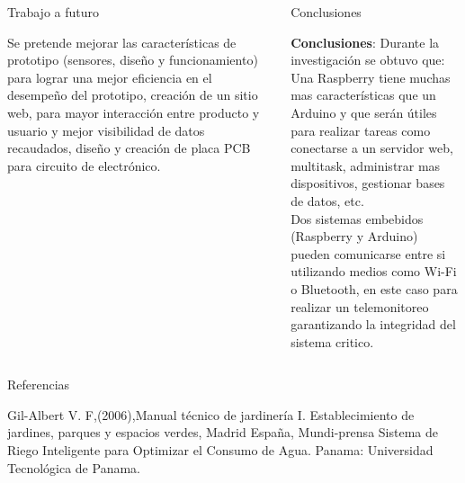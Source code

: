 \documentclass{beamer}
\begin{document}
\begin{frame}[fragile]{}
\begin{columns}[t]
  
  \begin{column}{0.46\linewidth}
  	\begin{block}{Trabajo a futuro}
  		\begin{minipage}[t]{1\textwidth}
  			\vspace{0pt}
 Se pretende mejorar las características de prototipo (sensores, diseño y funcionamiento) para lograr una mejor eficiencia en el desempeño del prototipo, creación de un sitio web, para mayor interacción entre producto y usuario y mejor visibilidad de datos recaudados, diseño y creación de placa PCB para circuito de electrónico.
  		\end{minipage} 
  	\end{block}
  \end{column}

	     \begin{column}{0.46\linewidth}
	     	\begin{block}{Conclusiones}\justifying
	     		\begin{minipage}[t]{0.96\textwidth}
	     			\textbf{Conclusiones}: 
	     			Durante la investigación se obtuvo que:\\
	     			Una Raspberry tiene muchas mas características que un Arduino y que serán útiles para realizar tareas como conectarse a un servidor web, multitask, administrar mas dispositivos, gestionar bases de datos, etc.
	     			\\
	     			Dos sistemas embebidos (Raspberry y Arduino) pueden comunicarse entre si utilizando medios como Wi-Fi o Bluetooth, en este caso para realizar un telemonitoreo garantizando la integridad del sistema critico.
	     			\\
	     			
	     		\end{minipage}
	     		
	     	\end{block}   
	     \end{column}
\end{columns}

\justifying
\begin{columns}[t]
 \begin{column}{0.90\linewidth}
      \begin{block}{Referencias}
	\begin{minipage}[t]{0.71\textwidth}
        \begin{small}
        \begin{thebibliography}{widestlabel}
        	 Gil-Albert V. F,(2006),Manual técnico de jardinería I. Establecimiento de jardines,
parques y espacios verdes, Madrid España, Mundi-prensa
        	 Sistema de Riego Inteligente para Optimizar el Consumo de
Agua. Panama: Universidad Tecnológica de Panama.


\end{thebibliography}
\end{small}
\end{minipage}
\end{block}
\end{column}
\end{columns}
\end{frame}
\end{document}
